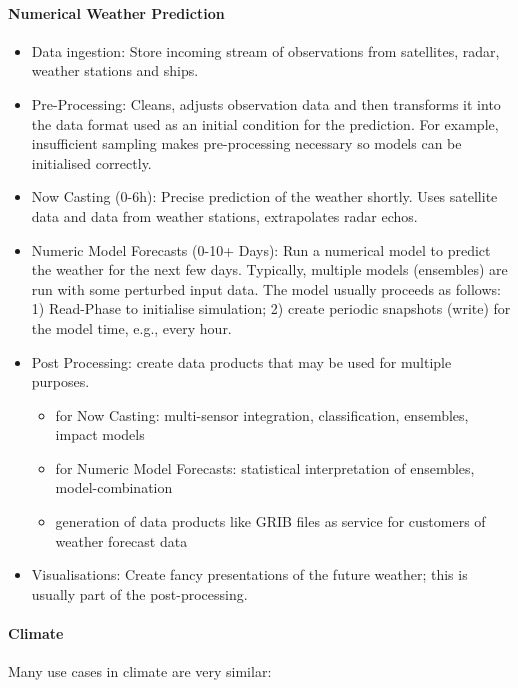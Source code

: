 \paragraph{Numerical Weather Prediction}

\begin{itemize}
	\item Data ingestion: Store incoming stream of observations from satellites, radar, weather stations and ships.
	\item Pre-Processing: Cleans, adjusts observation data and then transforms it into the data format used as an initial condition for the prediction. For example, insufficient sampling makes pre-processing necessary so models can be initialised correctly.
	\item Now Casting (0-6h): Precise prediction of the weather shortly.
	Uses satellite data and data from weather stations, extrapolates radar echos.
	\item Numeric Model Forecasts (0-10+ Days): Run a numerical model to predict the weather for the next few days.
	Typically, multiple models (ensembles) are run with some perturbed input data.
	The model usually proceeds as follows: 1) Read-Phase to initialise simulation; 2) create periodic snapshots (write) for the model time, e.g., every hour.
	\item  Post Processing: create data products that may be used for multiple purposes.
	\begin{itemize}
		\item for Now Casting: multi-sensor integration, classification, ensembles, impact models
		\item for Numeric Model Forecasts: statistical interpretation of ensembles, model-combination
		\item generation of data products like GRIB files as service for customers of weather forecast data
	\end{itemize}
	\item Visualisations: Create fancy presentations of the future weather; this is usually part of the post-processing.
\end{itemize}


\paragraph{Climate}

Many use cases in climate are very similar:

